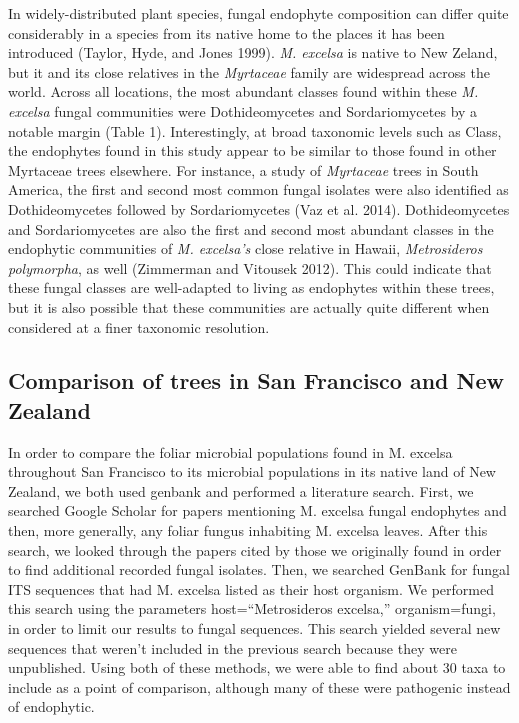 \documentclass[fleqn,10pt,lineno]{wlpeerj} %
\begin{document}
In widely-distributed plant species, fungal endophyte composition can differ quite considerably in a species from its native home to the places it has been introduced (Taylor, Hyde, and Jones 1999). \emph{M. excelsa} is native to New Zeland, but it and its close relatives in the \emph{Myrtaceae} family are widespread across the world. Across all locations, the most abundant classes found within these \emph{M. excelsa} fungal communities were Dothideomycetes and Sordariomycetes by a notable margin (Table 1). Interestingly, at broad taxonomic levels such as Class, the endophytes found in this study appear to be similar to those found in other Myrtaceae trees elsewhere. For instance, a study of \emph{Myrtaceae} trees in South America, the first and second most common fungal isolates were also identified as Dothideomycetes followed by Sordariomycetes (Vaz et al. 2014). Dothideomycetes and Sordariomycetes are also the first and second most abundant classes in the endophytic communities of \emph{M. excelsa's} close relative in Hawaii, \emph{Metrosideros polymorpha}, as well (Zimmerman and Vitousek 2012). This could indicate that these fungal classes are well-adapted to living as endophytes within these trees, but it is also possible that these communities are actually quite different when considered at a finer taxonomic resolution.

\hypertarget{comparison-of-trees-in-san-francisco-and-new-zealand}{%
\subsection*{Comparison of trees in San Francisco and New Zealand}\label{comparison-of-trees-in-san-francisco-and-new-zealand}}

In order to compare the foliar microbial populations found in M. excelsa throughout San Francisco to its microbial populations in its native land of New Zealand, we both used genbank and performed a literature search. First, we searched Google Scholar for papers mentioning M. excelsa fungal endophytes and then, more generally, any foliar fungus inhabiting M. excelsa leaves. After this search, we looked through the papers cited by those we originally found in order to find additional recorded fungal isolates.
Then, we searched GenBank for fungal ITS sequences that had M. excelsa listed as their host organism. We performed this search using the parameters host=``Metrosideros excelsa,'' organism=fungi, in order to limit our results to fungal sequences. This search yielded several new sequences that weren't included in the previous search because they were unpublished. Using both of these methods, we were able to find about 30 taxa to include as a point of comparison, although many of these were pathogenic instead of endophytic.
\end{document}
